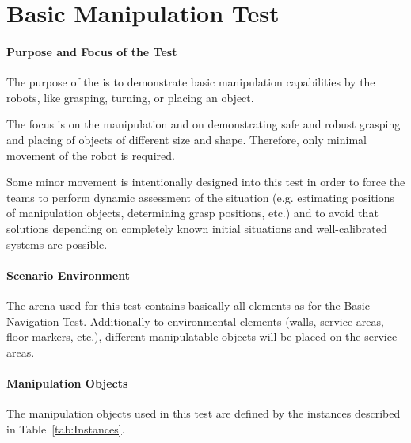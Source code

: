 \newpage
\section{Basic Manipulation Test}

\paragraph{Purpose and Focus of the Test}
The purpose of the  is to demonstrate basic manipulation capabilities by the robots, like grasping, turning, or placing an object.
\par
The focus is on the manipulation and on demonstrating safe and robust grasping and placing of objects of different size and shape. Therefore, only minimal movement of the robot is required.
\par
Some minor movement is intentionally designed into this test in order to force the teams to perform dynamic assessment of the situation (e.g. estimating positions of manipulation objects, determining grasp positions, etc.) and to avoid that solutions depending on completely known initial situations and well-calibrated systems are possible.

\paragraph{Scenario Environment}
The arena used for this test contains basically all elements as for the Basic Navigation Test. Additionally to environmental elements (walls, service areas, floor markers, etc.), different manipulatable objects will be placed on the service areas.

\paragraph{Manipulation Objects}
The manipulation objects used in this test are defined by the instances described in Table~\ref{tab:Instances}.

